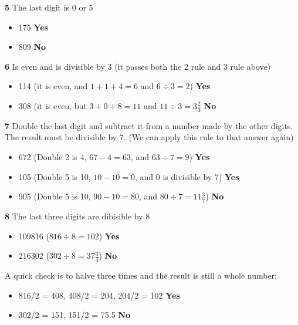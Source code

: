 \vspace{10 mm}

\textbf{5} The last digit is 0 or 5

\begin{itemize}
  \item 175 \textbf{Yes}
  \item 809 \textbf{No}
\end{itemize}

\textbf{6} Is even and is divisible by 3 (it passes both the 2 rule and 3 rule above)

\begin{itemize}
  \item 114 (it is even, and $1+1+4=6$ and $6 \div 3 =2$) \textbf{Yes}
  \item 308 (it is even, but $3+0+8=11$ and $11 \div 3 = 3\frac{2}{3}$ \textbf{No}
\end{itemize}

\textbf{7} Double the last digit and subtract it from a number made by the other digits. The result must be divisible by 7. (We can apply this rule to that answer again)

\begin{itemize}
  \item 672 (Double 2 is 4, $67-4=63$, and $63 \div 7 = 9$) \textbf{Yes}
  \item 105 (Double 5 is 10, $10-10=0$, and 0 is divisible by 7) \textbf{Yes}
  \item 905 (Double 5 is 10, $90-10=80$, and $80 \div 7 =11\frac{3}{7}$) \textbf{No}
\end{itemize}

\vspace{7 mm}

\textbf{8} The last three digits are dibisible by 8

\begin{itemize}
  \item 109816 ($816 \div 8=102$) \textbf{Yes}
  \item 216302 ($302\div 8=37\frac{3}{4}$) \textbf{No}
\end{itemize}

A quick check is to halve three times and the result is still a whole number:

\begin{itemize}
  \item 816/2 = 408, 408/2 = 204, 204/2 = 102 \textbf{Yes}
  \item 302/2 = 151, 151/2 = 75.5 \textbf{No}
\end{itemize}

